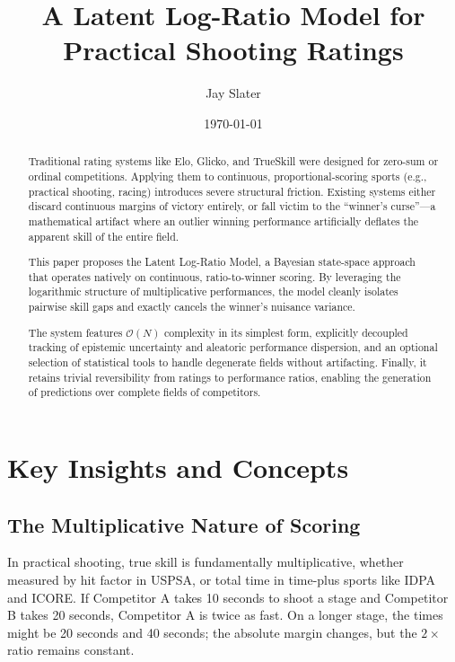 \documentclass[12pt]{article}
\title{A Latent Log-Ratio Model for Practical Shooting Ratings}
\author{Jay Slater}
\date{\today}
\begin{document}
	\maketitle

	\begin{abstract}
		Traditional rating systems like Elo, Glicko, and TrueSkill were designed for zero-sum or ordinal competitions. Applying them to continuous, proportional-scoring sports (e.g., practical shooting, racing) introduces severe structural friction. Existing systems either discard continuous margins of victory entirely, or fall victim to the ``winner's curse''—a mathematical artifact where an outlier winning performance artificially deflates the apparent skill of the entire field.

		This paper proposes the Latent Log-Ratio Model, a Bayesian state-space approach that operates natively on continuous, ratio-to-winner scoring. By leveraging the logarithmic structure of multiplicative performances, the model cleanly isolates pairwise skill gaps and exactly cancels the winner's nuisance variance.

		The system features $\mathcal{O}(N)$ complexity in its simplest form, explicitly decoupled tracking of epistemic uncertainty and aleatoric performance dispersion, and an optional selection of statistical tools to handle degenerate fields without artifacting. Finally, it retains trivial reversibility from ratings to performance ratios, enabling the generation of predictions over complete fields of competitors.
	\end{abstract}

	\section{Key Insights and Concepts}

	\subsection{The Multiplicative Nature of Scoring}
	In practical shooting, true skill is fundamentally multiplicative, whether measured by hit factor  in USPSA, or total time in time-plus sports like IDPA and ICORE. If Competitor A takes 10 seconds to shoot a stage and Competitor B takes 20 seconds, Competitor A is twice as fast. On a longer stage, the times might be 20 seconds and 40 seconds; the absolute margin changes, but the $2\times$ ratio remains constant.
\end{document}
